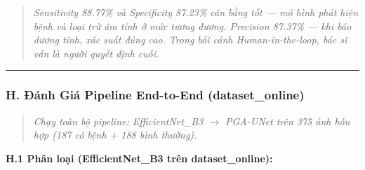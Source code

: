 \begin{table}[htbp]
\centering\renewcommand{\arraystretch}{1.2}
\end{table}

\begin{quote}\itshape Sensitivity 88.77\% và Specificity 87.23\% cân bằng tốt — mô hình phát hiện bệnh và loại trừ âm tính ở mức tương đương. Precision 87.37\% — khi báo dương tính, xác suất đúng cao. Trong bối cảnh Human-in-the-loop, bác sĩ vẫn là người quyết định cuối.\end{quote}

\vspace{0.5em}\hrule\vspace{0.5em}


\subsubsection{H. Đánh Giá Pipeline End-to-End (dataset\_online)}

\begin{quote}\itshape Chạy toàn bộ pipeline: EfficientNet\_B3 $\rightarrow$ PGA-UNet trên 375 ảnh hỗn hợp (187 có bệnh + 188 bình thường).\end{quote}

\textbf{H.1 Phân loại (EfficientNet\_B3 trên dataset\_online):}

\begin{table}[htbp]
\centering\renewcommand{\arraystretch}{1.2}
\end{table}

